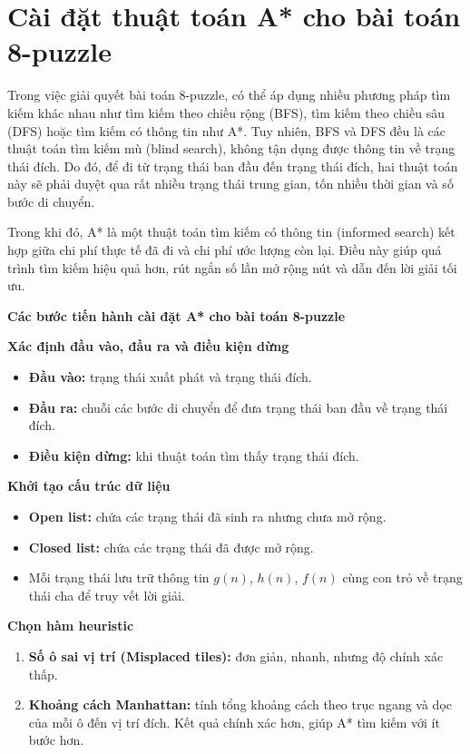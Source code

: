 \documentclass{article}
\begin{document}
\section{Cài đặt thuật toán A* cho bài toán 8-puzzle}

Trong việc giải quyết bài toán 8-puzzle, có thể áp dụng nhiều phương pháp tìm kiếm khác nhau 
như tìm kiếm theo chiều rộng (BFS), tìm kiếm theo chiều sâu (DFS) hoặc tìm kiếm có thông tin như A*. 
Tuy nhiên, BFS và DFS đều là các thuật toán tìm kiếm mù (blind search), không tận dụng được thông tin về trạng thái đích. 
Do đó, để đi từ trạng thái ban đầu đến trạng thái đích, hai thuật toán này sẽ phải duyệt qua rất nhiều trạng thái trung gian, 
tốn nhiều thời gian và số bước di chuyển.

Trong khi đó, A* là một thuật toán tìm kiếm có thông tin (informed search) 
kết hợp giữa chi phí thực tế đã đi và chi phí ước lượng còn lại. 
Điều này giúp quá trình tìm kiếm hiệu quả hơn, rút ngắn số lần mở rộng nút và dẫn đến lời giải tối ưu.

\textbf{Các bước tiến hành cài đặt A* cho bài toán 8-puzzle}

\textbf{Xác định đầu vào, đầu ra và điều kiện dừng}
\begin{itemize}
    \item \textbf{Đầu vào:} trạng thái xuất phát và trạng thái đích.
    \item \textbf{Đầu ra:} chuỗi các bước di chuyển để đưa trạng thái ban đầu về trạng thái đích.
    \item \textbf{Điều kiện dừng:} khi thuật toán tìm thấy trạng thái đích.
\end{itemize}

\textbf{Khởi tạo cấu trúc dữ liệu}
\begin{itemize}
    \item \textbf{Open list:} chứa các trạng thái đã sinh ra nhưng chưa mở rộng.
    \item \textbf{Closed list:} chứa các trạng thái đã được mở rộng.
    \item Mỗi trạng thái lưu trữ thông tin $g(n)$, $h(n)$, $f(n)$ cùng con trỏ về trạng thái cha để truy vết lời giải.
\end{itemize}

\textbf{Chọn hàm heuristic}
\begin{enumerate}
    \item \textbf{Số ô sai vị trí (Misplaced tiles):} đơn giản, nhanh, nhưng độ chính xác thấp.
    \item \textbf{Khoảng cách Manhattan:} tính tổng khoảng cách theo trục ngang và dọc của mỗi ô đến vị trí đích. 
    Kết quả chính xác hơn, giúp A* tìm kiếm với ít bước hơn.
\end{enumerate}
\end{document}
